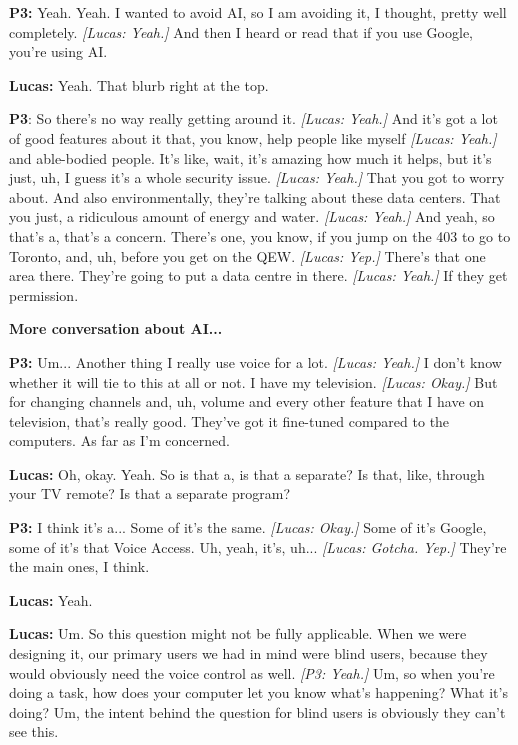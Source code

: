 \textbf{P3:} Yeah. Yeah. I wanted to avoid AI, so I am avoiding it, I thought, pretty well completely. \textit{[Lucas: Yeah.]} And then I heard or read that if you use Google, you're using AI. 

\textbf{Lucas:} Yeah. That blurb right at the top. 

\textbf{P3}: So there's no way really getting around it. \textit{[Lucas: Yeah.]} And it's got a lot of good features about it that, you know, help people like myself \textit{[Lucas: Yeah.]} and able-bodied people. It's like, wait, it's amazing how much it helps, but it's just, uh, I guess it's a whole security issue. \textit{[Lucas: Yeah.]} That you got to worry about. And also environmentally, they're talking about these data centers. That you just, a ridiculous amount of energy and water. \textit{[Lucas: Yeah.]} And yeah, so that's a, that's a concern. There's one, you know, if you jump on the 403 to go to Toronto, and, uh, before you get on the QEW. \textit{[Lucas: Yep.]} There's that one area there. They're going to put a data centre in there. \textit{[Lucas: Yeah.]} If they get permission. 

\textbf{ More conversation about AI...} 

\textbf{P3:} Um... Another thing I really use voice for a lot. \textit{[Lucas: Yeah.]} I don't know whether it will tie to this at all or not. I have my television. \textit{[Lucas: Okay.]} But for changing channels and, uh, volume and every other feature that I have on television, that's really good. They've got it fine-tuned compared to the computers. As far as I'm concerned. 

\textbf{Lucas:} Oh, okay. Yeah. So is that a, is that a separate? Is that, like, through your TV remote? Is that a separate program? 

\textbf{P3:} I think it's a... Some of it's the same. \textit{[Lucas: Okay.]} Some of it's Google, some of it's that Voice Access. Uh, yeah, it's, uh... \textit{[Lucas: Gotcha. Yep.]} They're the main ones, I think. 

\textbf{Lucas:} Yeah. 

\textbf{Lucas:} Um. So this question might not be fully applicable. When we were designing it, our primary users we had in mind were blind users, because they would obviously need the voice control as well. \textit{[P3: Yeah.]} Um, so when you're doing a task, how does your computer let you know what's happening? What it's doing? Um, the intent behind the question for blind users is obviously they can't see this. 

